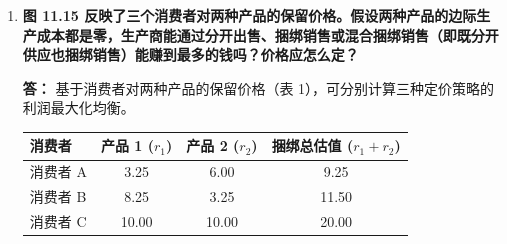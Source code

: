 \begin{enumerate}[label=\textbf{\arabic*.}, leftmargin=*]
\begin{center}
		\end{center}
		
		当人口结构发生剧变，高需求的发烧友扩张至 $3000$ 人时，我们需要重新评估战略。若退回仅限制发烧友入会的排他策略（即 $P=0, T=50$），凭借人口红利，周利润能够达到 $(50 \times 3000) - 10000 = 140000$ 美元。
		若继续向散客开放并实施混合两部收费，总收益函数将重构为：
		\[
		\begin{aligned}
			TR &= 4000T + P(3000Q_1 + 1000Q_2) \\
			&= 4000\left(32 - 4P + \frac{1}{8}P^2\right) + 1000P\left[3(10 - P) + (4 - 0.25P)\right] \\
			&= 1000(128 + 18P - 2.75P^2)
		\end{aligned}
		\]
		求解新的利润最大化条件：
		\[
		\begin{aligned}
			\frac{\mathrm{d}\pi}{\mathrm{d}P} = 1000(18 - 5.5P) = 0 \quad \Rightarrow \quad P \approx 3.27 \text{ 美元/小时}
		\end{aligned}
		\]
		将最优使用费代入，解得包含所有群体的最大化周利润为 $147455$ 美元。由于 $147455 > 140000$，即使发烧友在绝对基数上占据了压倒性优势，只要通过精算上调边际使用费（从 $3$ 美元升至 $3.27$ 美元）来动态挤压散客剩余并提取发烧友的增量价值，对散客保持开放依然是实现全局最优的有利可图之举。
		\newpage
		
		\item \textbf{图 11.15 反映了三个消费者对两种产品的保留价格。假设两种产品的边际生产成本都是零，生产商能通过分开出售、捆绑销售或混合捆绑销售（即既分开供应也捆绑销售）能赚到最多的钱吗？价格应怎么定？}
		
		\textbf{答：}
		基于消费者对两种产品的保留价格（表 1），可分别计算三种定价策略的利润最大化均衡。
		
		\begin{center}
			\renewcommand{\arraystretch}{1.1}
			\begin{tabular}{lccc}
				\toprule
				消费者 & 产品 1 ($r_1$) & 产品 2 ($r_2$) & 捆绑总估值 ($r_1+r_2$) \\
				\midrule
				消费者 A & 3.25 & 6.00 & 9.25 \\
				消费者 B & 8.25 & 3.25 & 11.50 \\
				消费者 C & 10.00 & 10.00 & 20.00 \\
				\bottomrule
			\end{tabular}
		\end{center}
		

\end{enumerate}
